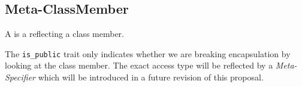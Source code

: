 \subsection{Meta-ClassMember}
\label{concept-Meta-ClassMember}

A  is a  reflecting a class member.





The \texttt{is\_public} trait only indicates whether we are breaking encapsulation
by looking at the class member. The exact access type will be reflected by
a {\em Meta-Specifier} which will be introduced in a future revision of this
proposal.
